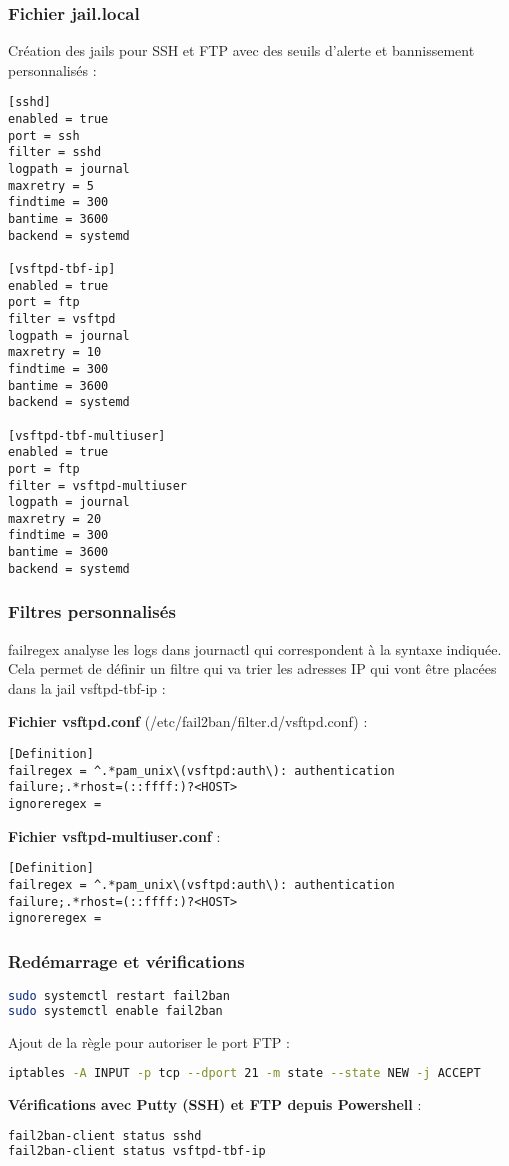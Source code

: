 \documentclass[12pt,a4paper]{article}
\begin{document}
\subsubsection{Fichier jail.local}

Cr\'eation des jails pour SSH et FTP avec des seuils d'alerte et bannissement personnalis\'es :

\begin{lstlisting}
[sshd]
enabled = true
port = ssh
filter = sshd
logpath = journal
maxretry = 5
findtime = 300
bantime = 3600
backend = systemd

[vsftpd-tbf-ip]
enabled = true
port = ftp
filter = vsftpd
logpath = journal
maxretry = 10
findtime = 300
bantime = 3600
backend = systemd

[vsftpd-tbf-multiuser]
enabled = true
port = ftp
filter = vsftpd-multiuser
logpath = journal
maxretry = 20
findtime = 300
bantime = 3600
backend = systemd
\end{lstlisting}

\subsubsection{Filtres personnalis\'es}

failregex analyse les logs dans journactl qui correspondent à la syntaxe indiquée. Cela permet de définir un filtre qui va trier les adresses IP qui vont être placées dans la jail vsftpd-tbf-ip : 


\textbf{Fichier vsftpd.conf} (/etc/fail2ban/filter.d/vsftpd.conf) :

\begin{lstlisting}
[Definition]
failregex = ^.*pam_unix\(vsftpd:auth\): authentication failure;.*rhost=(::ffff:)?<HOST>
ignoreregex =
\end{lstlisting}

\textbf{Fichier vsftpd-multiuser.conf} :

\begin{lstlisting}
[Definition]
failregex = ^.*pam_unix\(vsftpd:auth\): authentication failure;.*rhost=(::ffff:)?<HOST>
ignoreregex =
\end{lstlisting}

\subsubsection{Red\'emarrage et v\'erifications}

\begin{lstlisting}[language=bash]
sudo systemctl restart fail2ban
sudo systemctl enable fail2ban
\end{lstlisting}

Ajout de la r\`egle pour autoriser le port FTP :

\begin{lstlisting}[language=bash]
iptables -A INPUT -p tcp --dport 21 -m state --state NEW -j ACCEPT
\end{lstlisting}

\textbf{V\'erifications avec Putty (SSH) et FTP depuis Powershell} :

\begin{lstlisting}[language=bash]
fail2ban-client status sshd
fail2ban-client status vsftpd-tbf-ip
\end{lstlisting}
\end{document}

